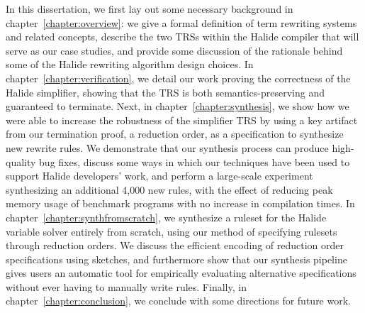 In this dissertation, we first lay out some necessary background in chapter~\ref{chapter:overview}: we give a formal definition of term rewriting systems and related concepts, describe the two TRSs within the Halide compiler that will serve as our case studies, and provide some discussion of the rationale behind some of the Halide rewriting algorithm design choices. In chapter~\ref{chapter:verification}, we detail our work proving the correctness of the Halide simplifier, showing that the TRS is both semantics-preserving and guaranteed to terminate. Next, in chapter~\ref{chapter:synthesis}, we show how we were able to increase the robustness of the simplifier TRS by using a key artifact from our termination proof, a reduction order, as a specification to synthesize new rewrite rules. We demonstrate that our synthesis process can produce high-quality bug fixes, discuss some ways in which our techniques have been used to support Halide developers' work, and perform a large-scale experiment synthesizing an additional 4,000 new rules, with the effect of reducing peak memory usage of benchmark programs with no increase in compilation times. In chapter~\ref{chapter:synthfromscratch}, we synthesize a ruleset for the Halide variable solver entirely from scratch, using our method of specifying rulesets through reduction orders. We discuss the efficient encoding of reduction order specifications using sketches, and furthermore show that our synthesis pipeline gives users an automatic tool for empirically evaluating alternative specifications without ever having to manually write rules. Finally, in chapter~\ref{chapter:conclusion}, we conclude with some directions for future work.
